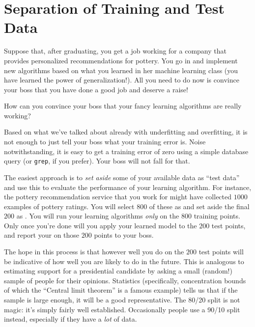 \section{Separation of Training and Test Data}

Suppose that, after graduating, you get a job working for a company
that provides personalized recommendations for pottery.  You go in and
implement new algorithms based on what you learned in her machine
learning class (you have learned the power of generalization!).  All
you need to do now is convince your boss that you have done a good job
and deserve a raise!

How can you convince your boss that your fancy learning algorithms are
really working?

Based on what we've talked about already with underfitting and
overfitting, it is not enough to just tell your boss what your
training error is.  Noise notwithstanding, it is easy to get a
training error of zero using a simple database query (or {\tt grep},
if you prefer).  Your boss will not fall for that.

The easiest approach is to \emph{set aside} some of your available
data as ``test data'' and use this to evaluate the performance of your
learning algorithm.  For instance, the pottery recommendation service
that you work for might have collected $1000$ examples of pottery
ratings.  You will select $800$ of these as 
and set aside the final $200$ as .  You will run
your learning algorithms \emph{only} on the $800$ training points.
Only once you're done will you apply your learned model to the $200$
test points, and report your  on those $200$
points to your boss.

The hope in this process is that however well you do on the $200$ test
points will be indicative of how well you are likely to do in the
future.  This is analogous to estimating support for a presidential
candidate by asking a small (random!) sample of people for their
opinions.  Statistics (specifically, concentration bounds of which the
``Central limit theorem'' is a famous example) tells us that if the
sample is large enough, it will be a good representative.  The 80/20
split is not magic: it's simply fairly well established.  Occasionally
people use a 90/10 split instead, especially if they have a \emph{lot}
of data.



